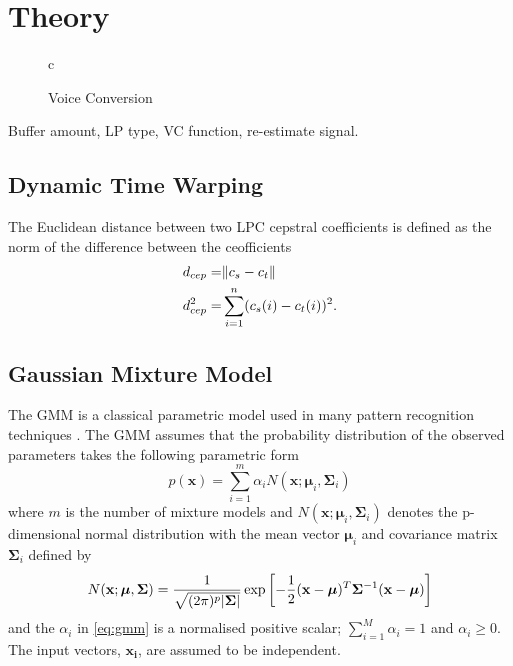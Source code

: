 \chapter{Theory} %
\label{cha:theory}

\begin{figure}[htbp]
  \centering
   \begin{tabular}[h]{c}
  \end{tabular}
  \caption{Voice Conversion}
  \label{fig:ADPCM}
\end{figure}
Buffer amount, LP type, VC function, re-estimate signal.

\section{Dynamic Time Warping} %
\label{sec:dynamic_time_warping}
The Euclidean distance between two LPC cepstral coefficients is defined as the norm of the difference between the ceofficients \cite{atal74}
\begin{equation}
	\label{eq:dtw_distance}
	\begin{split}
		d_{cep} = & \lVert c_s-c_t\rVert \\
		d_{cep}^2 = & \sum_{i=1}^{n} (c_s(i)-c_t(i))^2.
	\end{split}
\end{equation}

\section{Gaussian Mixture Model} %
\label{sec:gaussian_mixture_model}
The GMM is a classical parametric model used in many pattern recognition techniques \cite{stylianou98}. The GMM assumes that the probability distribution of the observed parameters takes the following parametric form
\begin{equation}
	\label{eq:gmm}
	p(\mathbf{x}) = \sum_{i=1}^{m} \alpha_i N(\mathbf{x}; \boldsymbol{\mu}_i, \mathbf{\Sigma}_i)
\end{equation}
where $m$ is the number of mixture models and $N(\mathbf{x}; \boldsymbol{\mu}_i, \mathbf{\Sigma}_i)$ denotes the p-dimensional normal distribution with the mean vector $\boldsymbol{\mu}_i$ and covariance matrix $\mathbf{\Sigma}_i$ defined by
\begin{equation}
	N(\mathbf{x}; \boldsymbol{\mu}, \mathbf{\Sigma}) = \frac{1}{\sqrt{(2\pi)^p\lvert\mathbf{\Sigma}\rvert}} \exp\left[ -\frac{1}{2} (\mathbf{x} -\boldsymbol{\mu})^T \mathbf{\Sigma}^{-1} (\mathbf{x} -\boldsymbol{\mu})\right]
\end{equation}
and the $\alpha_i$ in \eqref{eq:gmm} is a normalised positive scalar; $\sum_{i=1}^{M}\alpha_i = 1$ and $\alpha_i \geq 0$. The input vectors, $\mathbf{x_i}$, are assumed to be independent.

